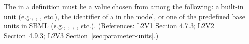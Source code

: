 The  in a \Parameter definition must be a value chosen from
among the following: a built-in unit (e.g., , ,
etc.), the identifier of a \UnitDefinition in the model, or one of the
predefined base units in SBML (e.g., , , ,
etc.).  (References: L2V1 Section 4.7.3; L2V2 Section~4.9.3; L2V3
Section~\ref{sec:parameter-units}.)

